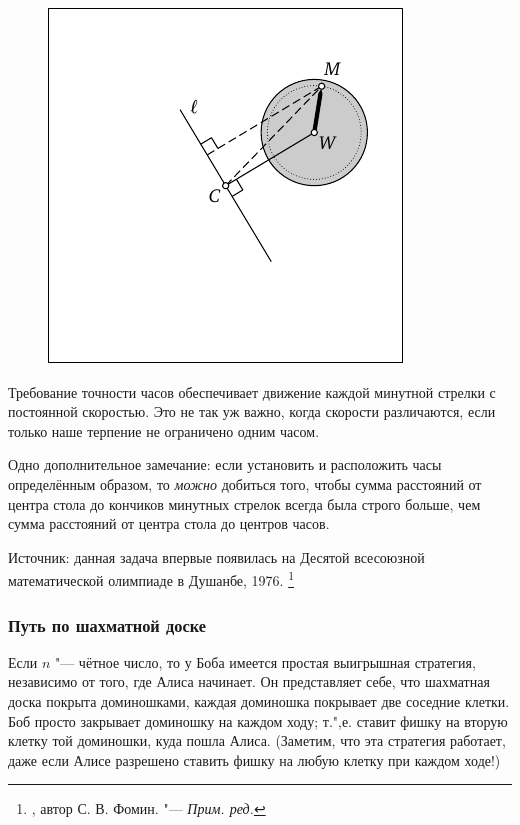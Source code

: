 \documentclass[twoside]{book}
\begin{document}
\begin{figure}[!ht]
\centering
\includegraphics{mp/wink-3}
\end{figure}

Требование точности часов обеспечивает движение каждой минутной стрелки с постоянной скоростью.
Это не так уж важно, когда скорости различаются, если только наше терпение не ограничено одним часом.

Одно дополнительное замечание: если установить и расположить часы определённым образом,
то \emph{можно} добиться того, чтобы сумма расстояний от центра стола до кончиков минутных стрелок всегда была строго больше, чем сумма расстояний от центра стола до центров часов.

\medskip

{\small
Источник: данная задача впервые появилась на Десятой всесоюзной математической олимпиаде в Душанбе, 1976. \footnote{\cite[№220]{ВсМО}, автор С. В. Фомин. "--- \emph{Прим. ред.}}

}
\subsubsection*{Путь по шахматной доске} %

Если $n$ "--- чётное число, то у Боба имеется простая выигрышная стратегия, независимо от того, где Алиса начинает.
Он представляет себе, что шахматная доска  покрыта доминошками, каждая доминошка покрывает две соседние клетки.
Боб просто закрывает доминошку на каждом ходу; т.",е. ставит фишку на вторую клетку той доминошки, куда пошла Алиса. 
(Заметим, что эта стратегия работает, даже если Алисе разрешено ставить фишку на любую клетку при каждом ходе!)
\end{document}
